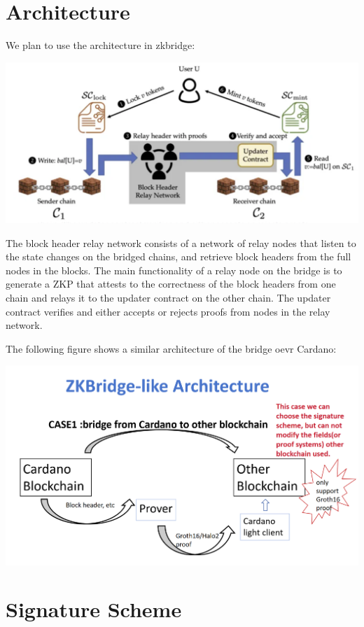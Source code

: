 \documentclass{article}
\begin{document}
\section{Architecture}

We plan to use the architecture in zkbridge:

\includegraphics[width=1\linewidth]{2024-05-01 153459.png}

The block header relay network consists of a network of relay nodes that listen to the state changes on the bridged chains, and retrieve block headers from the full nodes in the blocks. The main functionality of a relay node on the bridge is to generate a ZKP that attests to the correctness of the block headers from one chain and relays it to the updater contract on the other chain. The updater contract verifies and either accepts or rejects proofs from nodes in the relay network.

The following figure shows a similar architecture of the bridge oevr Cardano:


\includegraphics[width=1\linewidth]{cardano_bridge.png}


\section{Signature Scheme}
\end{document}
